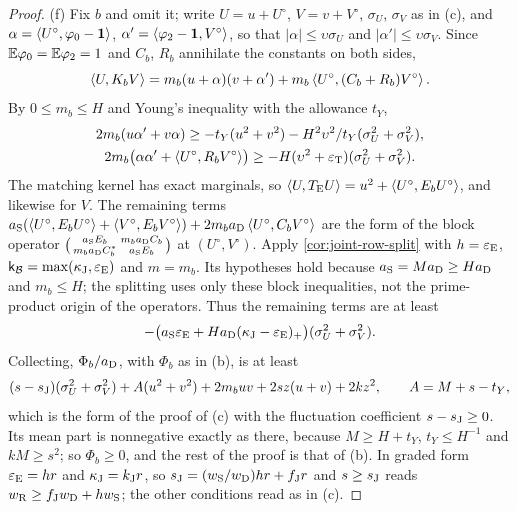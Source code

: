 \begin{proof}
(f) Fix $b$ and omit it; write $U=u+U^\circ$, $V=v+V^\circ$, $\sigma_U$, $\sigma_V$
as in (c), and $\alpha=\left\langle U^\circ,\varphi_0-\mathbf 1\right\rangle$,
$\alpha'=\left\langle \varphi_2-\mathbf 1,V^\circ\right\rangle$, so that $|\alpha|\le\upsilon\sigma_U$ and
$|\alpha'|\le\upsilon\sigma_V$. Since $\mathbb E\varphi_0=\mathbb E\varphi_2=1$ and $C_b$, $R_b$
annihilate the constants on both sides,
\[
 \left\langle U,K_bV\right\rangle=m_b(u+\alpha)(v+\alpha')+m_b\left\langle U^\circ,(C_b+R_b)V^\circ\right\rangle.
\]
By $0\le m_b\le H$ and Young's inequality with the allowance $t_Y$,
\begin{gather*}
 2m_b(u\alpha'+v\alpha)\ge-t_Y(u^2+v^2)
 -H^2\upsilon^2/t_Y(\sigma_U^2+\sigma_V^2),\\
 2m_b\bigl(\alpha\alpha'+\left\langle U^\circ,R_bV^\circ\right\rangle\bigr)\ge
 -H(\upsilon^2+\varepsilon_{\rm T})(\sigma_U^2+\sigma_V^2).
\end{gather*}
The matching kernel has exact marginals, so
$\left\langle U,T_{\rm E}U\right\rangle=u^2+\left\langle U^\circ,E_bU^\circ\right\rangle$, and likewise for $V$. The
remaining terms $a_{\rm S}(\left\langle U^\circ,E_bU^\circ\right\rangle+\left\langle V^\circ,E_bV^\circ\right\rangle)
+2m_ba_{\rm D}\left\langle U^\circ,C_bV^\circ\right\rangle$ are the form of the block operator
$\bigl(\begin{smallmatrix}a_{\rm S}E_b&m_ba_{\rm D}C_b\\
m_ba_{\rm D}C_b^*&a_{\rm S}E_b\end{smallmatrix}\bigr)$ at $(U^\circ,V^\circ)$. Apply \cref{cor:joint-row-split} with
$h=\varepsilon_{\rm E}$, $\mathsf k_\mathcal B=\max(\kappa_{\rm J},\varepsilon_{\rm E})$ and
$m=m_b$. Its hypotheses hold because $a_{\rm S}=Ma_{\rm D}\ge Ha_{\rm D}$
and $m_b\le H$; the splitting uses only these block inequalities, not the
prime-product origin of the operators. Thus the remaining terms are at least
\[
 -\bigl(a_{\rm S}\varepsilon_{\rm E}+Ha_{\rm D}(\kappa_{\rm J}-\varepsilon_{\rm E})_+\bigr)
 (\sigma_U^2+\sigma_V^2).
\]
Collecting, $\Phi_b/a_{\rm D}$, with $\Phi_b$ as in (b), is at least
\[
 (s-s_{\rm J})(\sigma_U^2+\sigma_V^2)+A(u^2+v^2)+2m_buv+2sz(u+v)+2kz^2,
 \qquad A=M+s-t_Y,
\]
which is the form of the proof of (c) with the fluctuation coefficient
$s-s_{\rm J}\ge0$. Its mean part is nonnegative exactly as there, because
$M\ge H+t_Y$, $t_Y\le H^{-1}$ and $kM\ge s^2$; so $\Phi_b\ge0$, and the
rest of the proof is that of (b). In graded form $\varepsilon_{\rm E}=hr$ and
$\kappa_{\rm J}=k_{\rm J}r$, so $s_{\rm J}=(w_{\rm S}/w_{\rm D})hr+f_{\rm J}r$ and
$s\ge s_{\rm J}$ reads $w_{\rm R}\ge f_{\rm J}w_{\rm D}+hw_{\rm S}$; the other conditions
read as in (c).
\end{proof}

